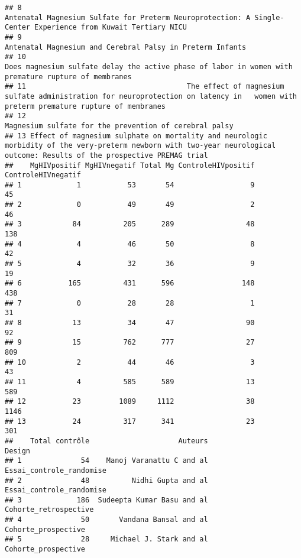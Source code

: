 \documentclass[
]{article}
\begin{document}
\begin{verbatim}
## 8                                                               Antenatal Magnesium Sulfate for Preterm Neuroprotection: A Single-Center Experience from Kuwait Tertiary NICU
## 9                                                                                                                   Antenatal Magnesium and Cerebral Palsy in Preterm Infants
## 10                                                                       Does magnesium sulfate delay the active phase of labor in women with premature rupture of membranes 
## 11                                      The effect of magnesium sulfate administration for neuroprotection on latency in   women with preterm premature rupture of membranes 
## 12                                                                                                                     Magnesium sulfate for the prevention of cerebral palsy
## 13 Effect of magnesium sulphate on mortality and neurologic morbidity of the very-preterm newborn with two-year neurological outcome: Results of the prospective PREMAG trial
##    MgHIVpositif MgHIVnegatif Total Mg ControleHIVpositif ControleHIVnegatif
## 1             1           53       54                  9                 45
## 2             0           49       49                  2                 46
## 3            84          205      289                 48                138
## 4             4           46       50                  8                 42
## 5             4           32       36                  9                 19
## 6           165          431      596                148                438
## 7             0           28       28                  1                 31
## 8            13           34       47                 90                 92
## 9            15          762      777                 27                809
## 10            2           44       46                  3                 43
## 11            4          585      589                 13                589
## 12           23         1089     1112                 38               1146
## 13           24          317      341                 23                301
##    Total contrôle                     Auteurs                   Design
## 1              54    Manoj Varanattu C and al Essai_controle_randomise
## 2              48          Nidhi Gupta and al Essai_controle_randomise
## 3             186  Sudeepta Kumar Basu and al    Cohorte_retrospective
## 4              50       Vandana Bansal and al      Cohorte_prospective
## 5              28     Michael J. Stark and al      Cohorte_prospective

\end{verbatim}
\end{document}
